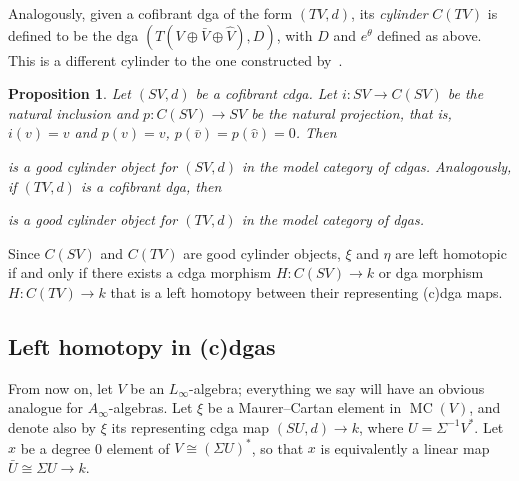 \documentclass[a4paper,reqno]{amsart}
\theoremstyle{plain}
\newtheorem{prop}[thm]{Proposition}
\theoremstyle{definition}
\theoremstyle{remark}
\DeclareMathOperator{\MC}{MC}
\begin{document}
Analogously, given a cofibrant dga of the form $(TV, d)$, its \emph{cylinder} $C(TV)$ is defined to be the dga $(T(V \oplus \bar{V} \oplus \widehat{V}), D)$, with $D$ and $e^{\theta}$ defined as above.
This is a different cylinder to the one constructed by~\cite{bl77}.

\begin{prop}\label{result:cyl_cdga}
  Let $(SV,d)$ be a cofibrant cdga. Let $i \colon SV \to C(SV)$ be the natural inclusion and $p \colon C(SV) \to SV$ be the natural projection, that is, $i(v)=v$ and $p(v)=v$, $p(\bar{v})=p(\widehat{v})=0$. Then 
  \begin{center}
  \end{center}
  is a good cylinder object for $(SV,d)$ in the model category of cdgas.
  Analogously, if $(TV,d)$ is a cofibrant dga, then
  \begin{center}
  \end{center}
  is a good cylinder object for $(TV,d)$ in the model category of dgas.
\end{prop}

Since $C(SV)$ and $C(TV)$ are good cylinder objects, $\xi$ and $\eta$ are left homotopic if and only if there exists a cdga morphism $H \colon C(SV) \to k$ or dga morphism $H \colon C(TV) \to k$ that is a left homotopy between their representing (c)dga maps.


\subsection{Left homotopy in (c)dgas}

From now on, let $V$ be an $L_{\infty}$-algebra; everything we say will have an obvious analogue for $A_{\infty}$-algebras.
Let $\xi$ be a Maurer--Cartan element in $\MC(V)$, and denote also by $\xi$ its representing cdga map $(SU,d) \to k$, where $U = \Sigma^{-1}V^*$.
Let $x$ be a degree 0 element of $V \cong (\Sigma U)^*$, so that $x$ is equivalently a linear map $\bar{U} \cong \Sigma U \to k$. 
\end{document}
